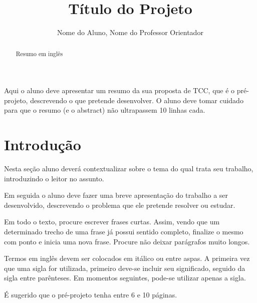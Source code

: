 \documentclass[12pt]{article}
\title{Título do Projeto}
\author{Nome do Aluno\inst{1}, Nome do Professor Orientador\inst{1}}
\begin{document}
 

\maketitle

\begin{abstract}
  Resumo em inglês
\end{abstract}
     
\begin{resumo} 
Aqui o aluno deve apresentar um resumo da sua proposta de TCC, que é o pré-projeto, descrevendo o que pretende desenvolver. O aluno deve tomar cuidado para que o resumo (e o abstract) não ultrapassem 10 linhas cada.
\end{resumo}

\section{Introdução} \label{sec:intro}

Nesta seção aluno deverá contextualizar sobre o tema do qual trata seu trabalho, introduzindo o leitor no assunto. 

Em seguida o aluno deve fazer uma breve apresentação do trabalho a ser desenvolvido, descrevendo o problema que ele pretende resolver ou estudar.

Em todo o texto, procure escrever frases curtas. Assim, vendo que um determinado trecho de uma frase já possui sentido completo, finalize o mesmo com ponto e inicia uma nova frase. Procure não deixar parágrafos muito longos.

Termos em inglês devem ser colocados em itálico ou entre aspas. A primeira vez que uma sigla for utilizada, primeiro deve-se incluir seu significado, seguido da sigla entre parênteses. Em momentos seguintes, pode-se utilizar apenas a sigla. 

É sugerido que o pré-projeto tenha entre 6 e 10 páginas.

\end{document}
